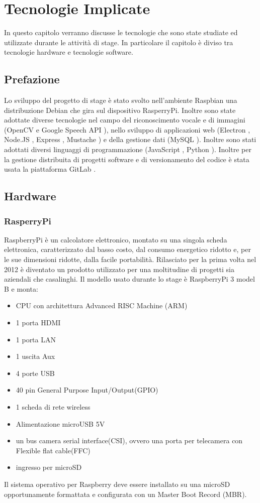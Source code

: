 \chapter{Tecnologie Implicate}\label{capitolo2}
In questo capitolo verranno discusse le tecnologie che sono state studiate ed utilizzate durante le attivit\`a di stage.
In particolare il capitolo \`e diviso tra tecnologie hardware e tecnologie software.

\section{Prefazione}
Lo sviluppo del progetto di stage \`e stato svolto nell'ambiente Raspbian\cite{Raspbian}
una distribuzione Debian\cite{Debian} che gira sul dispositivo RasperryPi\cite{Raspberry}.
Inoltre sono state adottate diverse tecnologie nel campo del riconoscimento vocale e di
immagini (OpenCV \cite{OpenCV-website} e Google Speech API \cite{GoogleSTT-website}),
nello sviluppo di applicazioni web (Electron \cite{Electron-website}, Node.JS \cite{Node.JS-website},
Express \cite{Express-website}, Mustache \cite{Mustache}) e della gestione dati (MySQL \cite{MySQL}).
Inoltre sono stati adottati diversi linguaggi di programmazione (JavaScript \cite{JavaScript}, Python \cite{Python}).
Inoltre per la gestione distribuita di progetti software e di versionamento del codice \`e
stata usata la piattaforma GitLab \cite{git-website}.

\section{Hardware}
\subsection{RasperryPi}
RaspberryPi \`e un calcolatore elettronico, montato su una singola scheda elettronica,
caratterizzato dal basso costo, dal consumo energetico ridotto e, per le sue
dimensioni ridotte, dalla facile portabilit\`a.
Rilasciato per la prima volta nel 2012 \`e diventato un prodotto utilizzato per una moltitudine
di progetti sia aziendali che casalinghi.
Il modello usato durante lo stage \`e RaspberryPi 3 model B e monta:
\begin{itemize}
\item CPU con architettura Advanced RISC Machine (ARM)
\item 1 porta HDMI
\item 1 porta LAN
\item 1 uscita Aux
\item 4 porte USB
\item 40 pin General Purpose Input/Output(GPIO)
\item 1 scheda di rete wireless
\item Alimentazione microUSB 5V
\item un bus camera serial interface(CSI), ovvero una porta per telecamera con Flexible flat cable(FFC)
\item ingresso per microSD
\end{itemize}
Il sistema operativo per Raspberry deve essere installato su una microSD opportunamente formattata
e configurata con un Master Boot Record (MBR).


